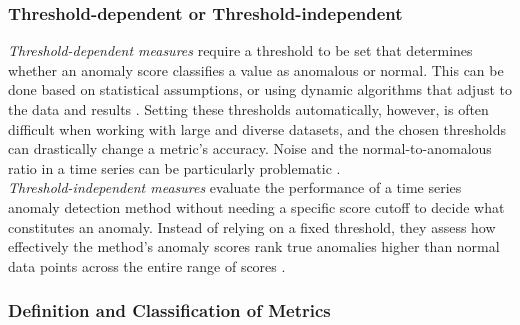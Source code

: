 \documentclass[12pt,oneside]{article}
\begin{document}
\subsubsection{Threshold-dependent or Threshold-independent}
\textit{Threshold-dependent measures} require a threshold to be set that determines whether an anomaly score classifies a value as anomalous or normal. This can be done based on statistical assumptions, or using dynamic algorithms that adjust to the data and results \parencites[p.~38-39]{boniol2024divetimeseriesanomalydetection}. Setting these thresholds automatically, however, is often difficult when working with large and diverse datasets, and the chosen thresholds can drastically change a metric's accuracy. Noise and the normal-to-anomalous ratio in a time series can be particularly problematic \parencites[p.~2777-2778]{papaVus}. \\
\textit{Threshold-independent measures} evaluate the performance of a time series anomaly detection method without needing a specific score cutoff to decide what constitutes an anomaly. Instead of relying on a fixed threshold, they assess how effectively the method's anomaly scores rank true anomalies higher than normal data points across the entire range of scores \parencites[p.~39-41]{boniol2024divetimeseriesanomalydetection}.

\subsubsection{Definition and Classification of Metrics}
\end{document}

